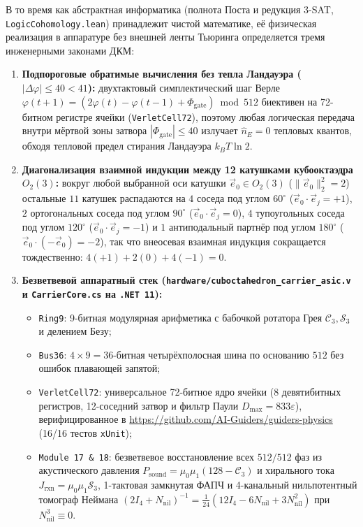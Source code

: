 В то время как абстрактная информатика (полнота Поста и редукция 3-SAT, \texttt{LogicCohomology.lean}) принадлежит чистой математике, её физическая реализация в аппаратуре без внешней ленты Тьюринга определяется тремя инженерными законами ДКМ:
\begin{enumerate}[label=\textbf{\arabic*.},leftmargin=*]
\item \textbf{Подпороговые обратимые вычисления без тепла Ландауэра ($|\Delta\varphi|\le 40 < 41$):}
  двухтактовый симплектический шаг Верле $\varphi(t+1) = (2\varphi(t) - \varphi(t-1) + \Phi_{\mathrm{gate}})\bmod 512$ биективен на 72-битном регистре ячейки (\texttt{VerletCell72}), поэтому любая логическая передача внутри мёртвой зоны затвора $|\Phi_{\mathrm{gate}}|\le 40$ излучает $\hat{n}_E = 0$ тепловых квантов, обходя тепловой предел стирания Ландауэра $k_B T\ln 2$.
\item \textbf{Диагонализация взаимной индукции между 12 катушками кубооктаэдра $O_2(3)$:}
  вокруг любой выбранной оси катушки $\vec{e}_0\in O_2(3)$ ($\|\vec{e}_0\|_2^2 = 2$) остальные $11$ катушек распадаются на $4$ соседа под углом $60^\circ$ ($\vec{e}_0\cdot\vec{e}_j = +1$), $2$ ортогональных соседа под углом $90^\circ$ ($\vec{e}_0\cdot\vec{e}_j = 0$), $4$ тупоугольных соседа под углом $120^\circ$ ($\vec{e}_0\cdot\vec{e}_j = -1$) и $1$ антиподальный партнёр под углом $180^\circ$ ($\vec{e}_0\cdot(-\vec{e}_0) = -2$), так что внеосевая взаимная индукция сокращается тождественно: $4(+1) + 2(0) + 4(-1) = 0$.
\item \textbf{Безветвевой аппаратный стек (\texttt{hardware/cuboctahedron\_carrier\_asic.v} и \texttt{CarrierCore.cs} на \texttt{.NET~11}):}
  \begin{itemize}[noitemsep]
  \item \texttt{Ring9}: 9-битная модулярная арифметика с бабочкой ротатора Грея $\mathcal{C}_3,\mathcal{S}_3$ и делением Безу;
  \item \texttt{Bus36}: $4\times 9 = 36$-битная четырёхполосная шина по основанию $512$ без ошибок плавающей запятой;
  \item \texttt{VerletCell72}: универсальное 72-битное ядро ячейки (8 девятибитных регистров, 12-соседний затвор и фильтр Паули $D_{\max} = 833\varepsilon$), верифицированное в \url{https://github.com/AI-Guiders/guiders-physics} (16/16 тестов \texttt{xUnit});
  \item \texttt{Module~17 \& 18}: безветвевое восстановление всех $512/512$ фаз из акустического давления $P_{\mathrm{sound}} = \mu_0\mu_1(128-\mathcal{C}_3)$ и хирального тока $J_{\mathrm{rxn}} = \mu_0\mu_1\mathcal{S}_3$, 1-тактовая замкнутая ФАПЧ и 4-канальный нильпотентный томограф Неймана $(2I_4 + N_{\mathrm{nil}})^{-1} = \frac{1}{24}(12 I_4 - 6 N_{\mathrm{nil}} + 3 N_{\mathrm{nil}}^2)$ при $N_{\mathrm{nil}}^3 \equiv 0$.

\end{itemize}
\end{enumerate}
